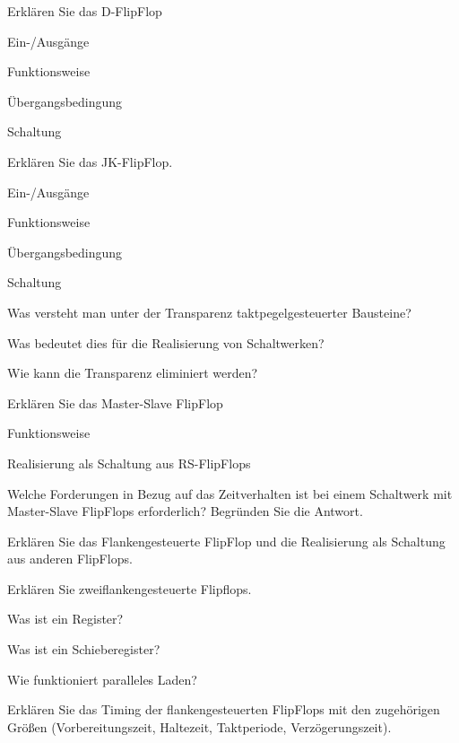 \documentclass
[
  draft    = true,
  fontsize = 11pt,
  parskip  = half-,
  BCOR     = 0pt,
  DIV      = 11,
  ngerman,
  dvipsnames
]
{scrartcl}
\begin{document}
\begin{mytemize}
  \item Erklären Sie das D-FlipFlop
        \begin{mytemize}
          \item Ein-/Ausgänge
          \item Funktionsweise
          \item Übergangsbedingung
          \item Schaltung
        \end{mytemize}
  \item Erklären Sie das JK-FlipFlop.
        \begin{mytemize}
          \item Ein-/Ausgänge
          \item Funktionsweise
          \item Übergangsbedingung
          \item Schaltung
        \end{mytemize}
  \item Was versteht man unter der Transparenz taktpegelgesteuerter Bausteine?
        \begin{mytemize}
          \item Was bedeutet dies für die Realisierung von Schaltwerken?
          \item Wie kann die Transparenz eliminiert werden?
        \end{mytemize}
  \item Erklären Sie das Master-Slave FlipFlop
        \begin{mytemize}
          \item Funktionsweise
          \item Realisierung als Schaltung aus RS-FlipFlops
        \end{mytemize}
  \item Welche Forderungen in Bezug auf das Zeitverhalten ist bei einem Schaltwerk mit Master-Slave FlipFlops erforderlich? Begründen Sie die Antwort.
  \item Erklären Sie das Flankengesteuerte FlipFlop und die Realisierung als Schaltung aus anderen FlipFlops.
  \item Erklären Sie zweiflankengesteuerte Flipflops.
  \item Was ist ein Register?
  \item Was ist ein Schieberegister?
  \item Wie funktioniert paralleles Laden?
  \item Erklären Sie das Timing der flankengesteuerten FlipFlops mit den zugehörigen Größen (Vorbereitungszeit, Haltezeit, Taktperiode, Verzögerungszeit).

\end{mytemize}
\end{document}
